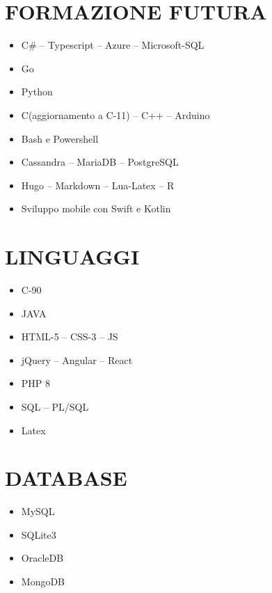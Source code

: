 \documentclass{clean_cv}
\begin{document}
    \section{FORMAZIONE FUTURA}
        \begin{multicols}{2}
            \begin{itemize}
                \item C\# -- Typescript -- Azure -- Microsoft-SQL
                \item Go
                \item Python
                \item C(aggiornamento a C-11) -- C++ -- Arduino
                \item Bash e Powershell
                \item Cassandra -- MariaDB -- PostgreSQL
                \item Hugo -- Markdown -- Lua-Latex -- R
                \item Sviluppo mobile con Swift e Kotlin
            \end{itemize}
        \end{multicols}

    \section{LINGUAGGI}
        \begin{multicols}{3}
            \begin{itemize}
                \item C-90
                \item JAVA
                \item HTML-5 -- CSS-3 -- JS
                \item jQuery -- Angular -- React
                \item PHP 8
                \item SQL -- PL/SQL
                \item Latex
            \end{itemize}
        \end{multicols}

    \section{DATABASE}
        \begin{multicols}{2}
            \begin{itemize}
                \item MySQL
                \item SQLite3
                \item OracleDB
                \item MongoDB
            \end{itemize}
        \end{multicols}
\end{document}
